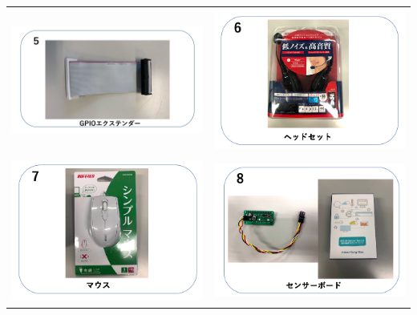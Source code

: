 \documentclass[a4paper,12pt]{jarticle}
\begin{document}
\begin{tabular}{cc}
  \includegraphics[width=6.488cm,height=4.697cm]{textbook-img005-2023.png}
   &
  \includegraphics[width=6.488cm,height=4.697cm]{textbook-img006.png} \\

  \includegraphics[width=6.488cm,height=4.697cm]{textbook-img003.png}
   &
  \includegraphics[width=6.488cm,height=4.697cm]{textbook-img004.png} \\


\end{tabular}
\end{document}
